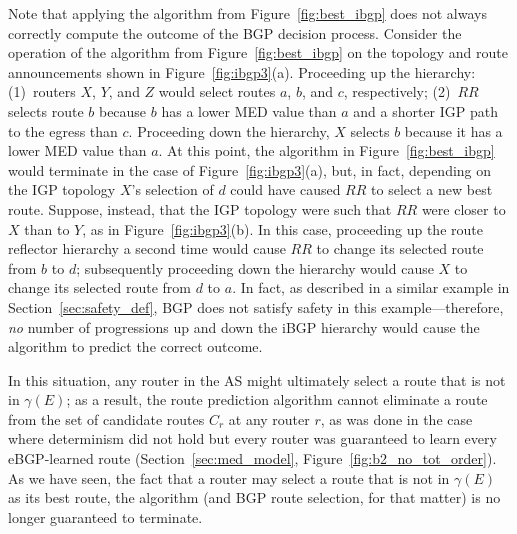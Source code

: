 Note that applying the algorithm from Figure~\ref{fig:best_ibgp} does
not always correctly compute the outcome of the BGP decision process.
Consider the operation of the algorithm from Figure~\ref{fig:best_ibgp}
on the topology and route announcements shown in Figure~\ref{fig:ibgp3}(a).
Proceeding up the hierarchy: (1)~routers $X$, $Y$, and $Z$ would select
routes $a$, $b$, and $c$, respectively; (2)~$RR$ selects route $b$
because $b$ has a lower MED value than $a$ and a shorter IGP path to the
egress than $c$.  Proceeding down the hierarchy, $X$ selects $b$ because
it has a lower MED value than $a$.  At this point, the algorithm in
Figure~\ref{fig:best_ibgp} would terminate in the case of
Figure~\ref{fig:ibgp3}(a), but, in fact, depending on the IGP topology
$X$'s selection of $d$ could have caused $RR$ to select a new best
route.  Suppose, instead, that the IGP topology were such that $RR$ were
closer to $X$ than to $Y$, as in Figure~\ref{fig:ibgp3}(b).  In this
case, proceeding up the route reflector hierarchy a second time would
cause $RR$ to change its selected route from $b$ to $d$; subsequently
proceeding down the hierarchy would cause $X$ to change its selected
route from $d$ to $a$.  In fact, as described in a similar example in
Section~\ref{sec:safety_def}, BGP does not satisfy safety in this
example---therefore, {\em no} number of progressions up and down the
iBGP hierarchy would cause the algorithm to predict the correct outcome.




In this situation, any router in the AS might ultimately select a route
that is not in $\gamma(E)$; as a result, the route prediction algorithm
cannot eliminate a route from the set of candidate routes $C_r$ at any
router $r$, as was done in the case where determinism did not hold but
every router was guaranteed to learn every eBGP-learned route
(Section~\ref{sec:med_model}, Figure~\ref{fig:b2_no_tot_order}).  As we
have seen, the fact that a router may select a route that is not in
$\gamma(E)$ as its best route, the algorithm (and BGP route selection,
for that matter) is no longer guaranteed to terminate.  

